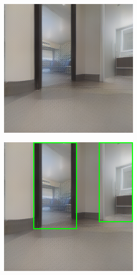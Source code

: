 \begin{figure}[h!]
\begin{subfigure}[b]{\linewidth}
\begin{subfigure}[b]{0.4\linewidth}
		\end{subfigure}
		\caption{}
		\label{fig:correct_box_1}
	\end{subfigure}
	\newline
	\begin{subfigure}[b]{\linewidth}
		\centering
		\begin{subfigure}[b]{0.4\linewidth}
			\includegraphics[width=\textwidth]{images/correct_box_rgb_2.png}
		\end{subfigure}
		\hfil
		\begin{subfigure}[b]{0.4\linewidth}
			\includegraphics[width=\textwidth]{images/correct_box_box_2.png}
		\end{subfigure}
	\caption{}	
	\label{fig:correct_box_2}
	\end{subfigure}


\end{figure}
